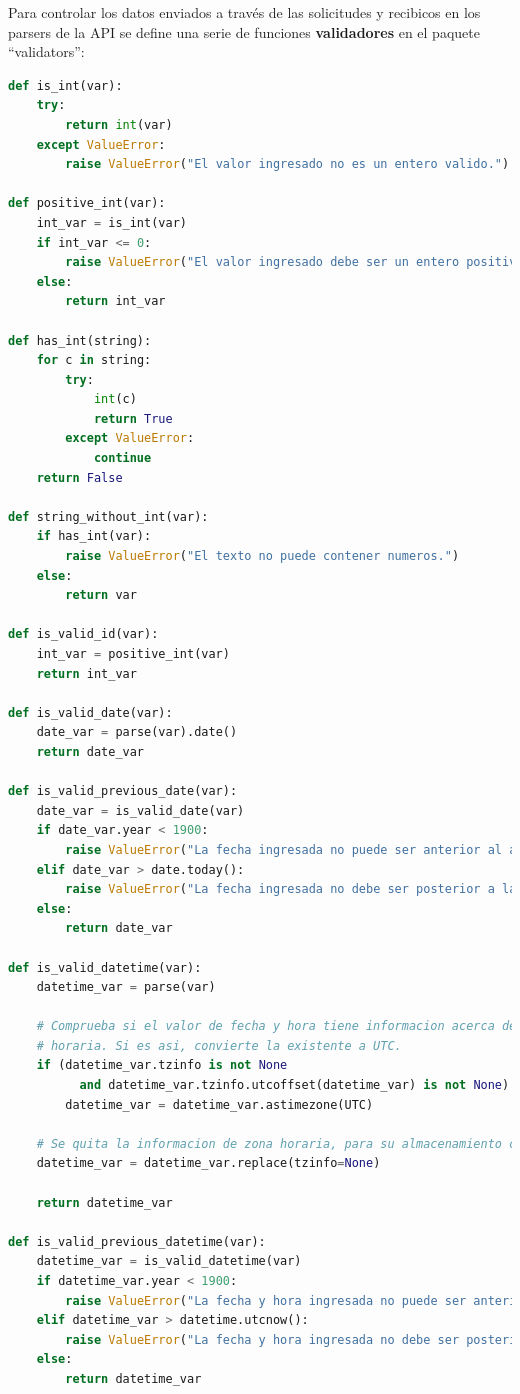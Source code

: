 Para controlar los datos enviados a través de las solicitudes y recibicos en los parsers de la API se define una serie de funciones \textbf{validadores} en el paquete ``validators'':

\begin{lstlisting}[language=Python]
def is_int(var):
    try:
        return int(var)
    except ValueError:
        raise ValueError("El valor ingresado no es un entero valido.")

def positive_int(var):
    int_var = is_int(var)
    if int_var <= 0:
        raise ValueError("El valor ingresado debe ser un entero positivo.")
    else:
        return int_var

def has_int(string):
    for c in string:
        try:
            int(c)
            return True
        except ValueError:
            continue
    return False

def string_without_int(var):
    if has_int(var):
        raise ValueError("El texto no puede contener numeros.")
    else:
        return var

def is_valid_id(var):
    int_var = positive_int(var)
    return int_var

def is_valid_date(var):
    date_var = parse(var).date()
    return date_var
    
def is_valid_previous_date(var):
    date_var = is_valid_date(var)
    if date_var.year < 1900:
        raise ValueError("La fecha ingresada no puede ser anterior al anio 1900.")
    elif date_var > date.today():
        raise ValueError("La fecha ingresada no debe ser posterior a la fecha actual.")
    else:
        return date_var

def is_valid_datetime(var):
    datetime_var = parse(var)

    # Comprueba si el valor de fecha y hora tiene informacion acerca de la zona
    # horaria. Si es asi, convierte la existente a UTC.
    if (datetime_var.tzinfo is not None
          and datetime_var.tzinfo.utcoffset(datetime_var) is not None):
        datetime_var = datetime_var.astimezone(UTC)

    # Se quita la informacion de zona horaria, para su almacenamiento como UTC.
    datetime_var = datetime_var.replace(tzinfo=None)

    return datetime_var

def is_valid_previous_datetime(var):
    datetime_var = is_valid_datetime(var)
    if datetime_var.year < 1900:
        raise ValueError("La fecha y hora ingresada no puede ser anterior al anio 1900.")
    elif datetime_var > datetime.utcnow():
        raise ValueError("La fecha y hora ingresada no debe ser posterior a la fecha y hora actual.")
    else:
        return datetime_var


\end{lstlisting}

